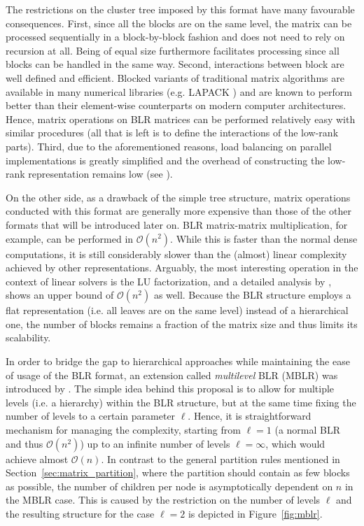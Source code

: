 The restrictions on the cluster tree imposed by this format have many favourable consequences. First, since all the blocks are on the same level, the matrix can be processed sequentially in a block-by-block fashion and does not need to rely on recursion at all. Being of equal size furthermore facilitates processing since all blocks can be handled in the same way. Second, interactions between block are well defined and efficient. Blocked variants of traditional matrix algorithms are available in many numerical libraries (e.g. LAPACK \cite{anderson_lapack_1999}) and are known to perform better than their element-wise counterparts on modern computer architectures. Hence, matrix operations on BLR matrices can be performed relatively easy with similar procedures (all that is left is to define the interactions of the low-rank parts). Third, due to the aforementioned reasons, load balancing on parallel implementations is greatly simplified and the overhead of constructing the low-rank representation remains low (see \cite{amestoy_improving_2015}). 

On the other side, as a drawback of the simple tree structure, matrix operations conducted with this format are generally more expensive than those of the other formats that will be introduced later on. BLR matrix-matrix multiplication, for example, can be performed in $\mathcal{O}(n^2)$. While this is faster than the normal dense computations, it is still considerably slower than the (almost) linear complexity achieved by other representations. Arguably, the most interesting operation in the context of linear solvers is the LU factorization, and a detailed analysis by \cite{amestoy_complexity_2017}, shows an upper bound of $\mathcal{O}(n^2)$ as well. Because the BLR structure employs a flat representation (i.e. all leaves are on the same level) instead of a hierarchical one, the number of blocks remains a fraction of the matrix size and thus limits its scalability.

In order to bridge the gap to hierarchical approaches while maintaining the ease of usage of the BLR format, an extension called \textit{multilevel} BLR (MBLR) was introduced by \cite{amestoy_bridging_2019}. The simple idea behind this proposal is to allow for multiple levels (i.e. a hierarchy) within the BLR structure, but at the same time fixing the number of levels to a certain parameter $\ell$. Hence, it is straightforward mechanism for managing the complexity, starting from $\ell=1$ (a normal BLR and thus $\mathcal{O}(n^2)$) up to an infinite number of levels $\ell=\infty$, which would achieve almost $\mathcal{O}(n)$. In contrast to the general partition rules mentioned in Section~\hyperref[sec:matrix_partition]{\ref{sec:matrix_partition}}, where the partition should contain as few blocks as possible, the number of children per node is asymptotically dependent on $n$ in the MBLR case. This is caused by the restriction on the number of levels $\ell$ and the resulting structure for the case $\ell = 2$ is depicted in Figure~\hyperref[fig:mblr]{\ref{fig:mblr}}.

